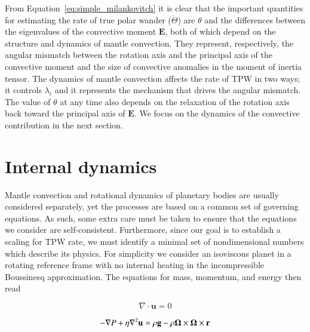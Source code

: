 \documentclass[preprint,12pt,authoryear]{elsarticle}
\newcommand{\mitbf}[1]{\hbox{\mathversion{bold}$#1$}}
\begin{document}
From Equation~\eqref{eq:simple_milankovitch} it is clear that the important quantities for estimating the rate of true polar wander ($\dot{\Theta}$)
are $\theta$ and the differences between the eigenvalues of the convective moment $\mathbf{E}$, both of which depend on the structure and dynamics of mantle convection.  
They represent, respectively, the angular mismatch between the rotation axis and the principal axis of the convective moment 
and the size of convective anomalies in the moment of inertia tensor. 
The dynamics of mantle convection affects the rate of TPW in two ways; 
it controls $\lambda_i$ and it represents the mechanism that drives the angular mismatch. 
The value of $\theta$ at any time also depends on the relaxation of the rotation axis back toward the principal axis of $\mathbf{E}$. 
We focus on the dynamics of the convective contribution in the next section.


\section{Internal dynamics}
\label{sec:internal}

Mantle convection and rotational dynamics of planetary bodies are usually considered separately, yet the processes are based on a common set of governing equations. 
As such, some extra care must be taken to ensure that the equations we consider are self-consistent. 
Furthermore, since our goal is to establish a scaling for TPW rate, we must identify a minimal set of nondimensional numbers which describe its physics.
For simplicity we consider an isoviscous planet in a rotating reference frame with no internal heating in the incompressible Boussinesq approximation.  The equations for mass, momentum, and energy then read

\begin{equation}
\nabla \cdot \mathbf{u} = 0
\label{eq:conserve_mass}
\end{equation}

\begin{equation}
\begin{aligned}
- \nabla P + \eta \nabla^2 \mathbf{u} =  \rho \mathbf{g} -  \rho \mitbf{\Omega} \times \mitbf{\Omega} \times \mathbf{r}
\label{eq:navier_stokes}
\end{aligned}
\end{equation}
\end{document}
